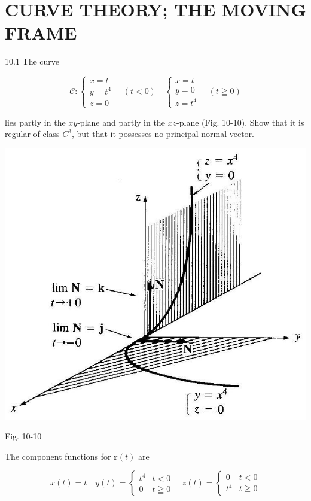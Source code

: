 \documentclass[10pt]{article}
\begin{document}
\section*{CURVE THEORY; THE MOVING FRAME}
10.1 The curve

$$
\mathscr{C}:\left\{\begin{array} { l } 
{ x = t } \\
{ y = t ^ { 4 } } \\
{ z = 0 }
\end{array} \quad ( t < 0 ) \quad \left\{\begin{array}{l}
x=t \\
y=0 \\
z=t^{4}
\end{array} \quad(t \geqq 0)\right.\right.
$$

lies partly in the $x y$-plane and partly in the $x z$-plane (Fig. 10-10). Show that it is regular of class $C^{3}$, but that it possesses no principal normal vector.

\begin{center}
\includegraphics[max width=\textwidth]{2024_04_03_41f90be4f896e21f0dc9g-148}
\end{center}

Fig. 10-10

The component functions for $\mathbf{r}(t)$ are

$$
x(t)=t \quad y(t)=\left\{\begin{array}{ll}
t^{4} & t<0 \\
0 & t \geqq 0
\end{array} \quad z(t)= \begin{cases}0 & t<0 \\
t^{4} & t \geqq 0\end{cases}\right.
$$
\end{document}
